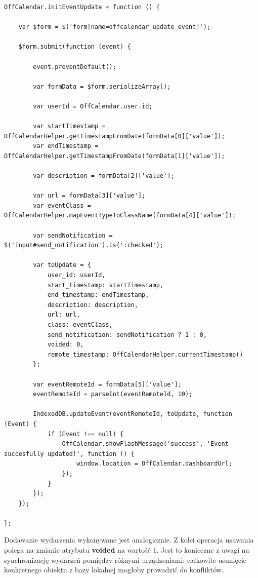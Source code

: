 \begin{lstlisting}[style=js, caption=Edycja wydarzenia cz. 2., label=amb, captionpos=b]
OffCalendar.initEventUpdate = function () {

    var $form = $('form[name=offcalendar_update_event]');

    $form.submit(function (event) {

        event.preventDefault();

        var formData = $form.serializeArray();

        var userId = OffCalendar.user.id;

        var startTimestamp = OffCalendarHelper.getTimestampFromDate(formData[0]['value']);
        var endTimestamp = OffCalendarHelper.getTimestampFromDate(formData[1]['value']);

        var description = formData[2]['value'];

        var url = formData[3]['value'];
        var eventClass = OffCalendarHelper.mapEventTypeToClassName(formData[4]['value']);

        var sendNotification = $('input#send_notification').is(':checked');

        var toUpdate = {
            user_id: userId,
            start_timestamp: startTimestamp,
            end_timestamp: endTimestamp,
            description: description,
            url: url,
            class: eventClass,
            send_notification: sendNotification ? 1 : 0,
            voided: 0,
            remote_timestamp: OffCalendarHelper.currentTimestamp()
        };

        var eventRemoteId = formData[5]['value'];
        eventRemoteId = parseInt(eventRemoteId, 10);

        IndexedDB.updateEvent(eventRemoteId, toUpdate, function (Event) {
            if (Event !== null) {
                OffCalendar.showFlashMessage('success', 'Event succesfully updated!', function () {
                    window.location = OffCalendar.dashboardUrl;
                });
            }
        });
    });

};
\end{lstlisting}

Dodawanie wydarzenia wykonywane jest analogicznie. Z kolei operacja usuwania polega na zmianie atrybutu \textbf{voided} na wartość 1. Jest to konieczne z uwagi na synchronizację wydarzeń pomiędzy różnymi urządzeniami: całkowite usunięcie konkretnego obiektu z bazy lokalnej mogłoby prowadzić do konfliktów.

